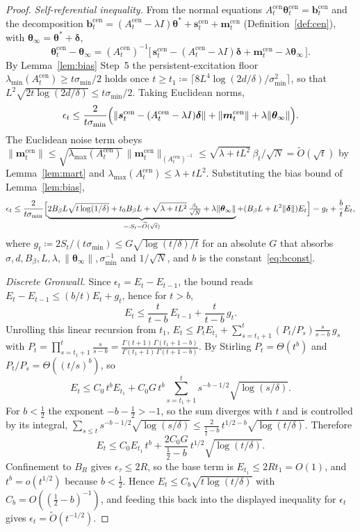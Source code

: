 \documentclass[11pt]{article}
\begin{document}
\begin{proof}
\emph{Self-referential inequality.}  From the normal equations
$A_t^{\mathrm{cen}}\bm{\theta}_t^{\mathrm{cen}}=\bm{b}_t^{\mathrm{cen}}$
and the decomposition
$\bm{b}_t^{\mathrm{cen}}=(A_t^{\mathrm{cen}}-\lambda I)\bm{\theta}^{\!*}
+\bm{s}_t^{\mathrm{cen}}+\bm{m}_t^{\mathrm{cen}}$
(Definition~\ref{def:cen}), with
$\bm{\theta}_\infty=\bm{\theta}^{\!*}+\bm{\delta}$,
\[
\bm{\theta}_t^{\mathrm{cen}}-\bm{\theta}_\infty
=(A_t^{\mathrm{cen}})^{-1}\bigl[\,\bm{s}_t^{\mathrm{cen}}
-(A_t^{\mathrm{cen}}-\lambda I)\bm{\delta}
+\bm{m}_t^{\mathrm{cen}}-\lambda\bm{\theta}_\infty\,\bigr].
\]
By Lemma~\ref{lem:bias} Step~5 the persistent-excitation floor
$\lambda_{\min}(A_t^{\mathrm{cen}})\geq t\sigma_{\min}/2$ holds once
$t\geq t_1\coloneqq\lceil 8L^4\log(2d/\delta)/\sigma_{\min}^2\rceil$,
so that $L^2\sqrt{2t\log(2d/\delta)}\leq t\sigma_{\min}/2$.  Taking
Euclidean norms,
\[
\epsilon_t
\leq\frac{2}{t\sigma_{\min}}\Bigl(
\|\bm{s}_t^{\mathrm{cen}}-(A_t^{\mathrm{cen}}-\lambda I)\bm{\delta}\|
+\|\bm{m}_t^{\mathrm{cen}}\|+\lambda\|\bm{\theta}_\infty\|\Bigr).
\]
The Euclidean noise term obeys
$\|\bm{m}_t^{\mathrm{cen}}\|\leq\sqrt{\lambda_{\max}(A_t^{\mathrm{cen}})}\,
\|\bm{m}_t^{\mathrm{cen}}\|_{(A_t^{\mathrm{cen}})^{-1}}
\leq\sqrt{\lambda+tL^2}\,\beta_t/\sqrt N=\widetilde O(\sqrt t)$
by Lemma~\ref{lem:mart} and $\lambda_{\max}(A_t^{\mathrm{cen}})\leq\lambda+tL^2$.
Substituting the bias bound of Lemma~\ref{lem:bias},
\[
\epsilon_t\leq\frac{2}{t\sigma_{\min}}
\Bigl[\underbrace{2B_\beta L\sqrt{t\log(1/\delta)}+t_0B_\beta L
+\sqrt{\lambda+tL^2}\,\tfrac{\beta_t}{\sqrt N}+\lambda\|\bm{\theta}_\infty\|}_{
=:S_t=\widetilde O(\sqrt t)}
+(B_\beta L+L^2\|\bm{\delta}\|)E_t\Bigr]
=g_t+\frac{b}{t}E_t,
\]
where $g_t\coloneqq 2S_t/(t\sigma_{\min})\leq G\sqrt{\log(t/\delta)/t}$
for an absolute $G$ that absorbs $\sigma,d,B_\beta,L,\lambda,
\|\bm{\theta}_\infty\|,\sigma_{\min}^{-1}$ and $1/\sqrt N$, and $b$ is
the constant~\eqref{eq:bconst}.

\emph{Discrete Gronwall.}  Since $\epsilon_t=E_t-E_{t-1}$, the bound
reads $E_t-E_{t-1}\leq (b/t)E_t+g_t$, hence for $t>b$,
\[
E_t\leq\frac{t}{t-b}\,E_{t-1}+\frac{t}{t-b}\,g_t .
\]
Unrolling this linear recursion from $t_1$,
$E_t\leq P_t E_{t_1}+\sum_{s=t_1+1}^t (P_t/P_s)\tfrac{s}{s-b}\,g_s$ with
$P_t=\prod_{s=t_1+1}^t\frac{s}{s-b}
=\frac{\Gamma(t+1)\,\Gamma(t_1+1-b)}{\Gamma(t_1+1)\,\Gamma(t+1-b)}$.
By Stirling $P_t=\Theta(t^b)$ and $P_t/P_s=\Theta((t/s)^b)$, so
\[
E_t\leq C_0\,t^b E_{t_1}
+C_0 G\,t^b\sum_{s=t_1+1}^t s^{-b-1/2}\sqrt{\log(s/\delta)} .
\]
For $b<\tfrac12$ the exponent $-b-\tfrac12>-1$, so the sum diverges with
$t$ and is controlled by its integral,
$\sum_{s\leq t}s^{-b-1/2}\sqrt{\log(s/\delta)}
\leq\frac{2}{\tfrac12-b}\,t^{1/2-b}\sqrt{\log(t/\delta)}$.  Therefore
\[
E_t\leq C_0 E_{t_1}\,t^b
+\frac{2C_0 G}{\tfrac12-b}\,t^{1/2}\sqrt{\log(t/\delta)} .
\]
Confinement to $B_R$ gives $\epsilon_\tau\leq 2R$, so the base term is
$E_{t_1}\leq 2Rt_1=O(1)$, and $t^b=o(t^{1/2})$ because $b<\tfrac12$.
Hence $E_t\leq C_b\sqrt{t\log(t/\delta)}$ with
$C_b=O((\tfrac12-b)^{-1})$, and feeding this back into the displayed
inequality for $\epsilon_t$ gives $\epsilon_t=\widetilde O(t^{-1/2})$.


\end{proof}
\end{document}
